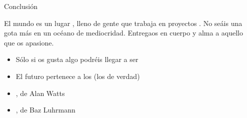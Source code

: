 \documentclass[14pt]{beamer}
\newcommand{\WebLink}[2]{
  \href{#1}{\structure{\PointingHand~\color{sail-green}{#2}}}
}
\begin{document}
\begin{frame}{Conclusión}
    \begin{block}{} \centering
      \normalsize El mundo es un lugar , lleno
      de gente  que trabaja en proyectos
      . No seáis una gota más en un océano de
      mediocridad. Entregaos en cuerpo y alma a aquello que os
      apasione.
    \end{block}

    \begin{itemize} \itemsep0em
      \item Sólo si os gusta algo podréis llegar a ser
      \item El futuro pertenece a los {\bf {}} (los de verdad)
      \item \WebLink{https://vimeo.com/65666763}
                    {What if Money Did not Matter?}, de Alan Watts
      \item \WebLink{https://www.youtube.com/watch?v=rAn4gZCd4HY}
                    {Everybody's Free To Wear Sunscreen}, de Baz Luhrmann
    \end{itemize}
\end{frame}
\end{document}
